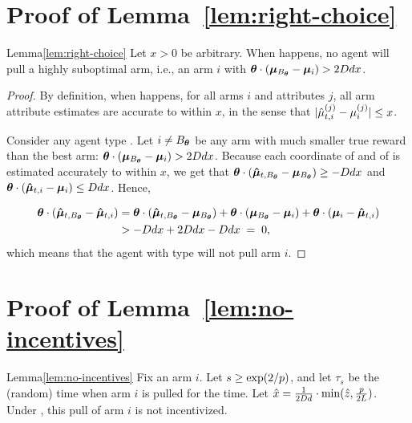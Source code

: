 \section{Proof of Lemma~\ref{lem:right-choice}}
\label{sec:lemma7-proof}

\begin{rlemma}{Lemma}{\ref{lem:right-choice}}
Let $x > 0$ be arbitrary.
When  happens,
no agent \AgV will pull a highly suboptimal arm, i.e., an arm $i$ with 
$\bm{\theta} \cdot (\bm{\mu}_{B_{\bm{\theta}}} - \bm{\mu}_{i}) > 2D d x$.
\end{rlemma}

\begin{proof}
By definition, when  happens,
for all arms $i$ and attributes $j$,
all arm attribute estimates are accurate to within $x$,
in the sense that
$|\hat{\mu}_{t,i}^{(j)} - \mu_{i}^{(j)}| \leq x$.

Consider any agent type \AgV.
Let $i \neq B_{\bm{\theta}}$ be any arm
with much smaller true reward than the best arm:
$\bm{\theta} \cdot (\bm{\mu}_{B_{\bm{\theta}}} - \bm{\mu}_{i}) > 2D d x$.
Because each coordinate of  and of
 is estimated accurately to within $x$, 
we get that 
$\bm{\theta} \cdot (\bm{\hat{\mu}}_{t,B_{\bm{\theta}}} - \bm{\mu}_{B_{\bm{\theta}}})
\geq - D d x$
and
$\bm{\theta} \cdot (\bm{\hat{\mu}}_{t,i} - \bm{\mu}_{i}) \leq D d x$.
Hence, 

\begin{align}
\bm{\theta} \cdot (\bm{\hat{\mu}}_{t,B_{\bm{\theta}}} - \bm{\hat{\mu}}_{t,i})
& =
\bm{\theta} \cdot (\bm{\hat{\mu}}_{t,B_{\bm{\theta}}} - \bm{\mu}_{B_{\bm{\theta}}})
+ \bm{\theta} \cdot (\bm{\mu}_{B_{\bm{\theta}}} - \bm{\mu}_{i})
+ \bm{\theta} \cdot (\bm{\mu}_{i} - \bm{\hat{\mu}}_{t,i}) \nonumber\\
& > -D d x + 2 D d x - D d x
\; = \; 0, \label{equ:choice}
\end{align}
which means that the agent with type \AgV will not pull arm $i$.
\end{proof}


\section{Proof of Lemma~\ref{lem:no-incentives}}
\label{sec:lemma8-proof}

\begin{rlemma}{Lemma}{\ref{lem:no-incentives}}
Fix an arm $i$.
Let $s \geq \exp(2/p)$, and let $\tau_s$ be the (random)
time when arm $i$ is pulled for the  time.
Let $\hat{x} = \frac{1}{2D d}
  \cdot \min(\hat{z}, \frac{p}{2L})$.
Under ,
this pull of arm $i$ is not incentivized.
\end{rlemma}

